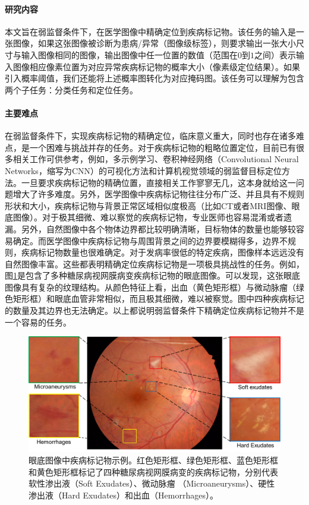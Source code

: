 \paragraph{研究内容} 本文旨在弱监督条件下，在医学图像中精确定位到疾病标记物。该任务的输入是一张图像，如果这张图像被诊断为患病/异常（图像级标签），则要求输出一张大小尺寸与输入图像相同的图像，输出图像中任一位置的数值（范围在$0$到$1$之间）表示输入图像相应像素位置为对应异常疾病标记物的概率大小（像素级定位结果）。如果引入概率阈值，我们还能将上述概率图转化为对应掩码图。该任务可以理解为包含两个子任务：分类任务和定位任务。

\paragraph{主要难点} 在弱监督条件下，实现疾病标记物的精确定位，临床意义重大，同时也存在诸多难点，是一个困难与挑战并存的任务。对于疾病标记物的粗略位置定位，目前已有很多相关工作可供参考，例如，多示例学习、卷积神经网络（Convolutional Neural Networks，缩写为CNN）的可视化方法和计算机视觉领域的弱监督目标定位方法。一旦要求疾病标记物的精确位置，直接相关工作寥寥无几，这本身就给这一问题增大了许多难度。另外，医学图像中疾病标记物往往分布广泛、并且具有不规则形状和大小，疾病标记物与背景正常区域相似度极高（比如CT或者MRI图像、眼底图像）。对于极其细微、难以察觉的疾病标记物，专业医师也容易混淆或者遗漏。另外，自然图像中各个物体边界都比较明确清晰，目标物体的数量也能够较容易确定。而医学图像中疾病标记物与周围背景之间的边界要模糊得多，边界不规则，疾病标记物数量也很难确定。对于发病率很低的特定疾病，图像样本远远没有自然图像丰富。这些都表明精确定位疾病标记物是一项极具挑战性的任务。例如，图\ref{fig:biomarker_localization_example}是包含了多种糖尿病视网膜病变疾病标记物的眼底图像。可以发现，这张眼底图像具有复杂的纹理结构。从颜色特征上看，出血（黄色矩形框）与微动脉瘤（绿色矩形框）和眼底血管非常相似，而且极其细微，难以被察觉。图中四种疾病标记的数量及其边界也无法确定。以上都说明弱监督条件下精确定位疾病标记物并不是一个容易的任务。
\begin{figure}[h]
	\centering
	\includegraphics[width=1.0\textwidth]{figure/biomarker_localization_example}
	\caption{眼底图像中疾病标记物示例。红色矩形框、绿色矩形框、蓝色矩形框和黄色矩形框标记了四种糖尿病视网膜病变的疾病标记物，分别代表软性渗出液（Soft Exudates）、微动脉瘤
		（Microaneurysms）、硬性渗出液（Hard Exudates）和出血（Hemorrhages）。} 
	\label{fig:biomarker_localization_example}
\end{figure}

